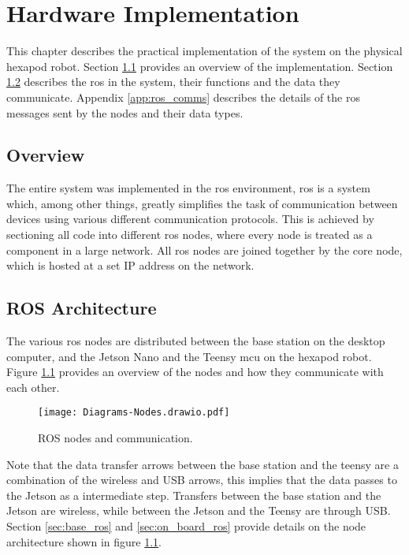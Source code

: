\chapter{Hardware Implementation} \label{chap:hardware}
This chapter describes the practical implementation of the system on the physical hexapod robot. Section  \ref{sec:hardware_overview} provides an overview of the implementation. Section \ref{sec:ros_nodes} describes the \ac{ros} in the system, their functions and the data they communicate. Appendix \ref{app:ros_comms} describes the details of the \ac{ros} messages sent by the nodes and their data types.

\section{Overview} \label{sec:hardware_overview}
The entire system was implemented in the \acf{ros} environment, \ac{ros} is a system which, among other things, greatly simplifies the task of communication between devices using various different communication protocols. This is achieved by sectioning all code into different \ac{ros} nodes, where every node is treated as a component in a large network. All ros nodes are joined together by the core node, which is hosted at a set IP address on the network.

\newpage
\section{ROS Architecture} \label{sec:ros_nodes}
    The various \ac{ros} nodes are distributed between the base station on the desktop computer, and the Jetson Nano and the Teensy \ac{mcu} on the hexapod robot. Figure \ref{fig:nodes} provides an overview of the nodes and how they communicate with each other.

    \begin{figure}[h]
        \centering
        \texttt{[image: Diagrams-Nodes.drawio.pdf]}
        \caption{ROS nodes and communication.}
        \label{fig:nodes}
    \end{figure}

    \noindent
    Note that the data transfer arrows between the base station and the teensy are a combination of the wireless and USB arrows, this implies that the data passes to the Jetson as a intermediate step. Transfers between the base station and the Jetson are wireless, while between the Jetson and the Teensy are through USB. Section \ref{sec:base_ros} and \ref{sec:on_board_ros} provide details on the node architecture shown in figure \ref{fig:nodes}.

